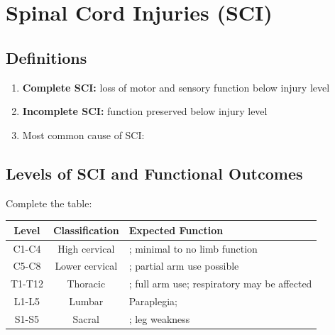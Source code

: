 \documentclass[11pt]{article}
\begin{document}
\hrulefill

\section{Spinal Cord Injuries (SCI)}

\subsection{Definitions}
\begin{enumerate}
    \item \textbf{Complete SCI:} \underline{\hspace{4cm}} loss of motor and sensory function below injury level
    
    \item \textbf{Incomplete SCI:} \underline{\hspace{4cm}} function preserved below injury level
    
    \item Most common cause of SCI: \underline{\hspace{3cm}}
\end{enumerate}

\subsection{Levels of SCI and Functional Outcomes}
Complete the table:

\begin{center}
\begin{tabular}{|c|c|p{6cm}|}
\hline
\textbf{Level} & \textbf{Classification} & \textbf{Expected Function} \\
\hline
C1-C4 & High cervical & \underline{\hspace{4cm}}; minimal to no limb function \\
\hline
C5-C8 & Lower cervical & \underline{\hspace{3cm}}; partial arm use possible \\
\hline
T1-T12 & Thoracic & \underline{\hspace{3cm}}; full arm use; respiratory may be affected \\
\hline
L1-L5 & Lumbar & Paraplegia; \underline{\hspace{3cm}} \\
\hline
S1-S5 & Sacral & \underline{\hspace{4cm}}; leg weakness \\
\hline
\end{tabular}
\end{center}
\end{document}
